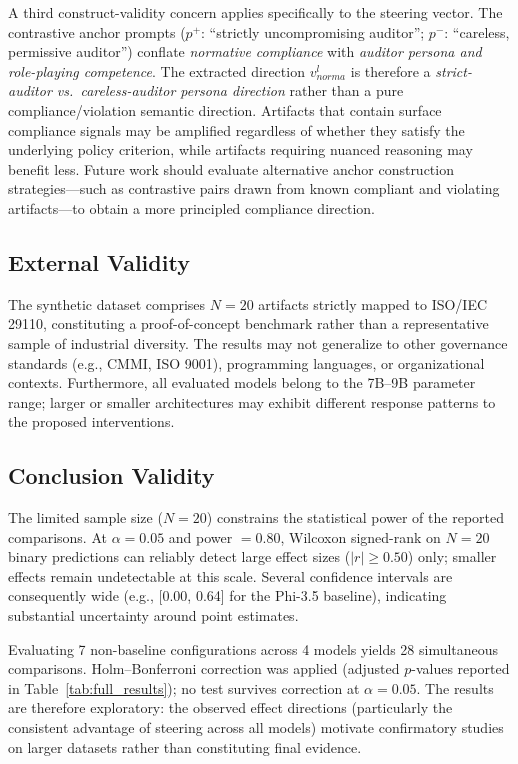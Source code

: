 \documentclass{ieeeaccess}
\begin{document}
A third construct-validity concern applies specifically to the steering vector. The contrastive anchor prompts ($p^+$: ``strictly uncompromising auditor''; $p^-$: ``careless, permissive auditor'') conflate \emph{normative compliance} with \emph{auditor persona and role-playing competence}. The extracted direction $v_{norma}^l$ is therefore a \emph{strict-auditor vs.\ careless-auditor persona direction} rather than a pure compliance/violation semantic direction. Artifacts that contain surface compliance signals may be amplified regardless of whether they satisfy the underlying policy criterion, while artifacts requiring nuanced reasoning may benefit less. Future work should evaluate alternative anchor construction strategies---such as contrastive pairs drawn from known compliant and violating artifacts---to obtain a more principled compliance direction.

\subsection{External Validity}

The synthetic dataset comprises $N=20$ artifacts strictly mapped to ISO/IEC 29110, constituting a proof-of-concept benchmark rather than a representative sample of industrial diversity. The results may not generalize to other governance standards (e.g., CMMI, ISO 9001), programming languages, or organizational contexts. Furthermore, all evaluated models belong to the 7B--9B parameter range; larger or smaller architectures may exhibit different response patterns to the proposed interventions.

\subsection{Conclusion Validity}

The limited sample size ($N=20$) constrains the statistical power of the reported comparisons. At $\alpha=0.05$ and power $= 0.80$, Wilcoxon signed-rank on $N=20$ binary predictions can reliably detect large effect sizes ($|r| \geq 0.50$) only; smaller effects remain undetectable at this scale. Several confidence intervals are consequently wide (e.g., [0.00, 0.64] for the Phi-3.5 baseline), indicating substantial uncertainty around point estimates.

Evaluating 7 non-baseline configurations across 4 models yields 28 simultaneous comparisons. Holm--Bonferroni correction was applied (adjusted $p$-values reported in Table~\ref{tab:full_results}); no test survives correction at $\alpha=0.05$. The results are therefore exploratory: the observed effect directions (particularly the consistent advantage of steering across all models) motivate confirmatory studies on larger datasets rather than constituting final evidence.
\end{document}
